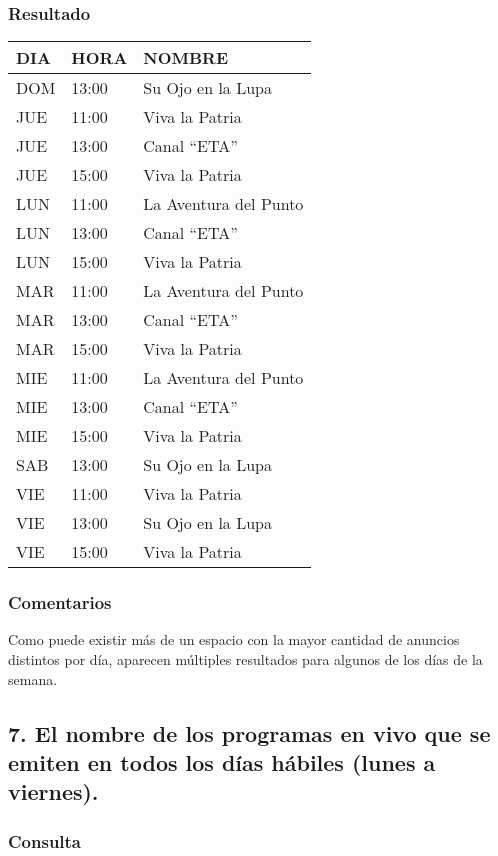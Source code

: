 \subsubsection*{Resultado}
\begin{tabular}{|l|l|l|}
  \hline
    \bf{DIA} & \bf{HORA} & \bf{NOMBRE} \\ 
  \hline
    DOM & 13:00 & Su Ojo en la Lupa \\ 
    JUE & 11:00 & Viva la Patria \\ 
    JUE & 13:00 & Canal ``ETA'' \\ 
    JUE & 15:00 & Viva la Patria \\ 
    LUN & 11:00 & La Aventura del Punto \\ 
    LUN & 13:00 & Canal ``ETA'' \\ 
    LUN & 15:00 & Viva la Patria \\ 
    MAR & 11:00 & La Aventura del Punto \\ 
    MAR & 13:00 & Canal ``ETA'' \\ 
    MAR & 15:00 & Viva la Patria \\ 
    MIE & 11:00 & La Aventura del Punto \\ 
    MIE & 13:00 & Canal ``ETA'' \\ 
    MIE & 15:00 & Viva la Patria \\ 
    SAB & 13:00 & Su Ojo en la Lupa \\ 
    VIE & 11:00 & Viva la Patria \\ 
    VIE & 13:00 & Su Ojo en la Lupa \\ 
    VIE & 15:00 & Viva la Patria \\ 
  \hline
\end{tabular} 

\subsubsection*{Comentarios}
Como puede existir más de un espacio con la mayor cantidad de anuncios distintos por día, aparecen múltiples resultados para algunos de los días de la semana.

\subsection*{7. \normalsize{El nombre de los programas en vivo que se emiten en todos los d\'ias h\'abiles (lunes a viernes).}}

\subsubsection*{Consulta}

